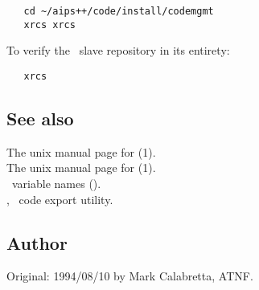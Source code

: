 \begin{verbatim}
   cd ~/aips++/code/install/codemgmt
   xrcs xrcs
\end{verbatim}

To verify the \aipspp\ slave repository in its entirety:

\begin{verbatim}
   xrcs
\end{verbatim}

\subsection*{See also}

The unix manual page for (1).\\
The unix manual page for (1).\\
\aipspp\ variable names ().\\
, \aipspp\ code export utility.

\subsection*{Author}

Original: 1994/08/10 by Mark Calabretta, ATNF.

